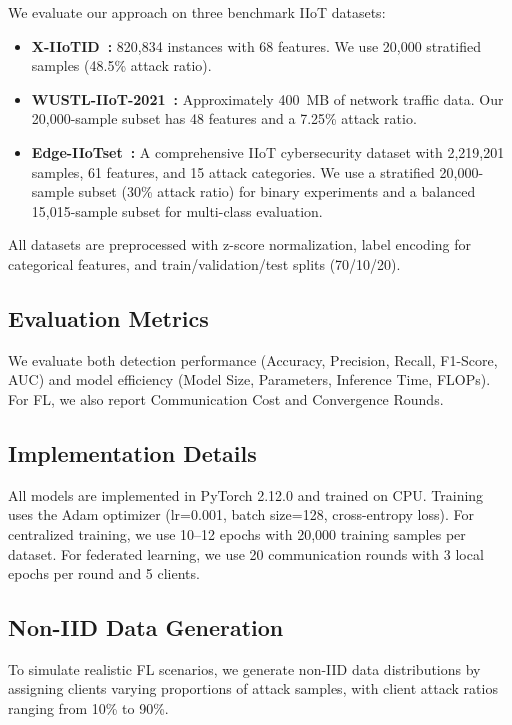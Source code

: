 \documentclass[10pt,journal]{IEEEtran}
\begin{document}
We evaluate our approach on three benchmark IIoT datasets:
\begin{itemize}
    \item \textbf{X-IIoTID~\cite{alhawawreh2021xiitoid}:} 820,834 instances with 68 features. We use 20,000 stratified samples (48.5\% attack ratio).
    \item \textbf{WUSTL-IIoT-2021~\cite{zolanvari2021wustl}:} Approximately 400~MB of network traffic data. Our 20,000-sample subset has 48 features and a 7.25\% attack ratio.
    \item \textbf{Edge-IIoTset~\cite{ferrag2022edgeiiotset}:} A comprehensive IIoT cybersecurity dataset with 2,219,201 samples, 61 features, and 15 attack categories. We use a stratified 20,000-sample subset (30\% attack ratio) for binary experiments and a balanced 15,015-sample subset for multi-class evaluation.
\end{itemize}
All datasets are preprocessed with z-score normalization, label encoding for categorical features, and train/validation/test splits (70/10/20).

\subsection{Evaluation Metrics}

We evaluate both detection performance (Accuracy, Precision, Recall, F1-Score, AUC) and model efficiency (Model Size, Parameters, Inference Time, FLOPs). For FL, we also report Communication Cost and Convergence Rounds.

\subsection{Implementation Details}

All models are implemented in PyTorch 2.12.0 and trained on CPU. Training uses the Adam optimizer (lr=0.001, batch size=128, cross-entropy loss). For centralized training, we use 10--12 epochs with 20,000 training samples per dataset. For federated learning, we use 20 communication rounds with 3 local epochs per round and 5 clients.

\subsection{Non-IID Data Generation}

To simulate realistic FL scenarios, we generate non-IID data distributions by assigning clients varying proportions of attack samples, with client attack ratios ranging from 10\% to 90\%.
\end{document}
